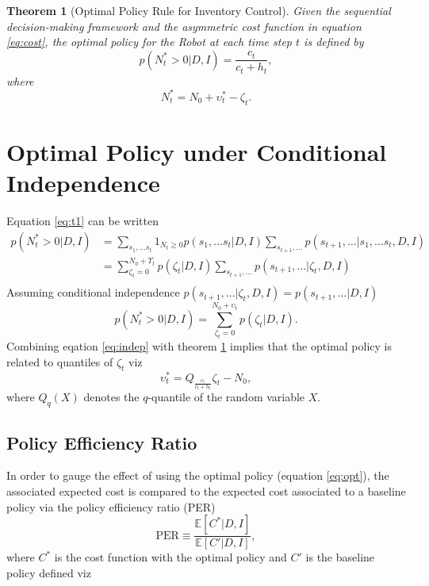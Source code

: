 \documentclass[a4paper,12pt]{article}
\newtheorem{theorem}{Theorem}
\begin{document}
	\begin{theorem}[Optimal Policy Rule for Inventory Control]
		\label{theorem:opt_policy}
		Given the sequential decision-making framework and the asymmetric cost function in equation \eqref{eq:cost}, the optimal policy for the Robot at each time step $t$ is defined by
		\begin{equation}
			p(N_t^* > 0 | D, I) = \frac{c_t}{c_t + h_t},
			\label{eq:t1}
		\end{equation}
		where
		\begin{equation}
			N_t^* = N_0 +\upsilon_t^*-\zeta_t.
		\end{equation}
	\end{theorem}
	
	
	\section{Optimal Policy under Conditional Independence}
	Equation \eqref{eq:t1} can be written
	\begin{equation}
		\begin{split}
			p(N_t^* > 0 | D, I) &= \sum_{s_1,\dots s_t}1_{N_{t}\geq 0}p(s_1,\dots s_t|D,I)\sum_{s_{t+1},\dots}p(s_{t+1},\dots|s_1,\dots s_t,D,I)\\
			& = \sum_{\zeta_t=0}^{N_0+\Upsilon_t}p(\zeta_t|D,I)\sum_{s_{t+1},\dots}p(s_{t+1},\dots|\zeta_t,D,I)\\
		\end{split}
	\end{equation}
	Assuming conditional independence $p(s_{t+1},\dots|\zeta_t,D,I)=p(s_{t+1},\dots|D,I)$
	\begin{equation}
			p(N_t^* > 0 | D, I)  = \sum_{\zeta_t=0}^{N_0+\upsilon_t}p(\zeta_t|D,I).
			\label{eq:indep}
	\end{equation}
	Combining eqation \eqref{eq:indep} with theorem \ref{theorem:opt_policy} implies that the optimal policy is related to quantiles of $\zeta_t$ viz
	\begin{equation}
		\upsilon_t^* = Q_{\frac{c_t}{c_t+h_t}}\zeta_t-N_0,
		\label{eq:opt}
	\end{equation}
	where $Q_q(X)$ denotes the $q$-quantile of the random variable $X$. 
	
	\subsection{Policy Efficiency Ratio}
	In order to gauge the effect of using the optimal policy (equation \eqref{eq:opt}), the associated expected cost is compared to the expected cost associated to a baseline policy via the policy efficiency ratio (PER)
	\begin{equation}
		\text{PER}\equiv \frac{\mathbb{E}[C^*|D,I]}{\mathbb{E}[C'|D,I]},
		\label{eq:per_def}
	\end{equation}
	where $C^*$ is the cost function with the optimal policy and $C'$ is the baseline policy defined viz
	
\end{document}
